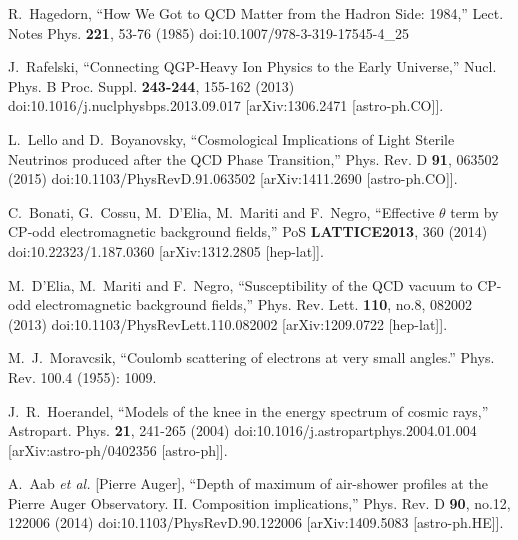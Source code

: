 \documentclass[universe,article,submit,moreauthors,pdftex,a4paper]{Definitions/mdpi}
\begin{document}
\begin{thebibliography}{99}
R.~Hagedorn,
``How We Got to QCD Matter from the Hadron Side: 1984,''
Lect. Notes Phys. \textbf{221}, 53-76 (1985)
doi:10.1007/978-3-319-17545-4\_25

J.~Rafelski,
``Connecting QGP-Heavy Ion Physics to the Early Universe,''
Nucl. Phys. B Proc. Suppl. \textbf{243-244}, 155-162 (2013)
doi:10.1016/j.nuclphysbps.2013.09.017
[arXiv:1306.2471 [astro-ph.CO]].

L.~Lello and D.~Boyanovsky,
``Cosmological Implications of Light Sterile Neutrinos produced after the QCD Phase Transition,''
Phys. Rev. D \textbf{91}, 063502 (2015)
doi:10.1103/PhysRevD.91.063502
[arXiv:1411.2690 [astro-ph.CO]].

C.~Bonati, G.~Cossu, M.~D'Elia, M.~Mariti and F.~Negro,
``Effective $\theta$ term by CP-odd electromagnetic background fields,''
PoS \textbf{LATTICE2013}, 360 (2014)
doi:10.22323/1.187.0360
[arXiv:1312.2805 [hep-lat]].

M.~D'Elia, M.~Mariti and F.~Negro,
``Susceptibility of the QCD vacuum to CP-odd electromagnetic background fields,''
Phys. Rev. Lett. \textbf{110}, no.8, 082002 (2013)
doi:10.1103/PhysRevLett.110.082002
[arXiv:1209.0722 [hep-lat]].

M.~J.~Moravcsik, ``Coulomb scattering of electrons at very small angles.'' Phys. Rev. 100.4 (1955): 1009.

J.~R.~Hoerandel,
``Models of the knee in the energy spectrum of cosmic rays,''
Astropart. Phys. \textbf{21}, 241-265 (2004)
doi:10.1016/j.astropartphys.2004.01.004
[arXiv:astro-ph/0402356 [astro-ph]].

A.~Aab \textit{et al.} [Pierre Auger],
``Depth of maximum of air-shower profiles at the Pierre Auger Observatory. II. Composition implications,''
Phys. Rev. D \textbf{90}, no.12, 122006 (2014)
doi:10.1103/PhysRevD.90.122006
[arXiv:1409.5083 [astro-ph.HE]].


\end{thebibliography}
\end{document}
